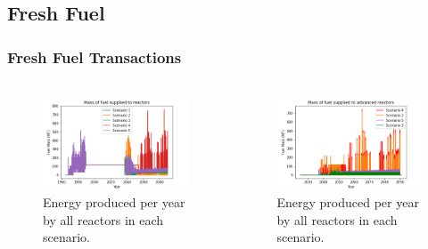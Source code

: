 \subsection{Fresh Fuel}
\begin{frame}
    \frametitle{Fresh Fuel Transactions}
    \begin{columns}
        \column[t]{5cm}

        \column[t]{5cm}
        \vspace{-0.8cm}
        \begin{figure}
            \centering 
            \includegraphics[scale=0.3]{figures/fuelsupply_scenarios_all.png}
            \caption{Energy produced per year by all reactors in each scenario.}
            \label{fig:fuel_allRX}
        \end{figure}
        \vspace{-0.8cm}
        \begin{figure}
            \centering 
            \includegraphics[scale=0.3]{figures/advancedRX_fuelsupply_scenarios_2-5.png}
            \vspace{0cm}
            \caption{Energy produced per year by all reactors in each scenario.}
            \label{fig:fuel_advancedRX}
        \end{figure}
    \end{columns}
    

\end{frame}

